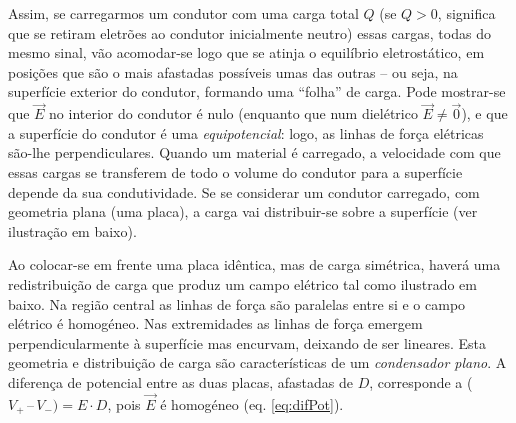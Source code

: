 \documentclass[a4paper,twoside,12pt]{article}      %
\begin{document}
Assim, se carregarmos um condutor com uma carga total $Q$ (se $Q > 0$, significa que se retiram eletrões ao condutor inicialmente neutro) essas cargas, todas do mesmo sinal, vão
acomodar-se logo que se atinja o equilíbrio eletrostático, em posições que são o mais afastadas possíveis umas das outras -- ou seja, na superfície exterior do condutor, formando uma ``folha'' de carga. Pode mostrar-se que $\vec{E}$ no interior do condutor é nulo (enquanto que num
dielétrico $\vec{E} \ne \vec{0}$), e que a superfície do condutor é uma \emph{equipotencial}: logo, as linhas de força elétricas são-lhe perpendiculares. Quando um material é carregado, a velocidade com que essas cargas se transferem de todo o volume do condutor para a superfície depende da sua condutividade. Se se considerar um condutor carregado, com geometria plana (uma placa), a carga vai distribuir-se sobre a superfície (ver ilustração em baixo).
\setlength{\unitlength}{0.8cm} 
\begin{center}
\end{center}
Ao colocar-se em frente uma placa idêntica, mas de carga simétrica, haverá uma redistribuição de carga que produz um campo elétrico tal como ilustrado em baixo. Na região central as linhas de força são paralelas entre si e o campo elétrico é homogéneo. Nas extremidades as linhas de força emergem perpendicularmente à superfície mas encurvam, deixando de ser lineares. Esta geometria e distribuição de carga são características de um \emph{condensador plano}. A diferença de potencial entre as duas placas, afastadas de $D$, corresponde a ($V_+ \,–\, V_-) = E\cdot D$, pois $\vec{E}$ é homogéneo (eq. \ref{eq:difPot}).\\
\setlength{\unitlength}{1.0cm} 
\begin{center}
\end{center}
\end{document}
